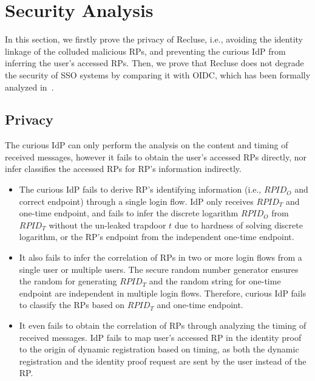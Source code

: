 \section{Security Analysis}
\label{sec:analysis}
In this section, we firstly prove the privacy of Recluse, i.e., avoiding the identity linkage of the colluded malicious RPs, and preventing the curious IdP from inferring the user's accessed RPs.
Then, we prove that Recluse does not degrade the security of SSO systems by comparing it with OIDC, which has been formally analyzed in~\cite{Fett2017The}.


\subsection{Privacy}
\label{subsec:privacy}
 The curious IdP can only perform the analysis on the content and timing of received messages, however it fails to obtain the user's accessed RPs directly, nor infer classifies the accessed RPs for RP's information indirectly.
\begin{itemize}
  \item The curious IdP fails to derive RP's identifying information (i.e., $RPID_O$ and correct endpoint) through a single login flow. IdP only receives $RPID_T$ and one-time endpoint, and fails to infer the discrete logarithm $RPID_O$ from $RPID_T$ without the un-leaked trapdoor $t$  due to hardness of solving discrete logarithm, or the RP's endpoint from the independent one-time endpoint.
  \item It also fails to infer the correlation of RPs in two or more login flows from a single user or multiple users. The secure random number generator ensures the random for generating $RPID_T$ and the random string for one-time endpoint are independent in multiple login flows. Therefore, curious IdP fails to classify the RPs based on $RPID_T$ and one-time endpoint.
  \item It even fails to obtain the correlation of RPs through analyzing the timing of received messages. IdP fails to map user's accessed RP in the identity proof to the origin of dynamic registration based on timing, as both the dynamic registration and the identity proof request are sent by the user instead of the RP.
\end{itemize}

